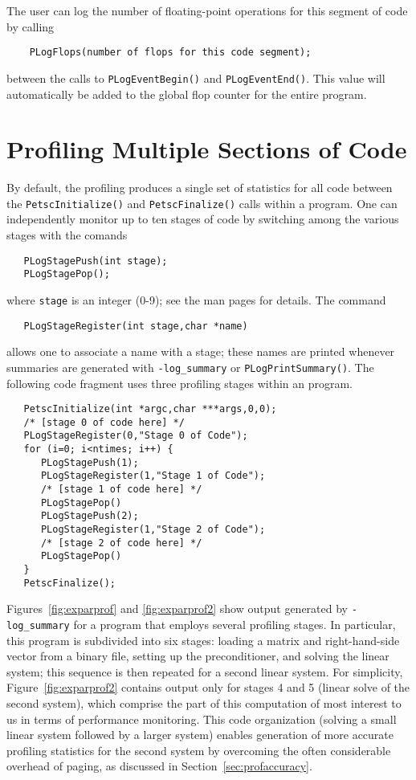 The user can log the number of floating-point operations 
for this segment of code by calling 
\begin{verbatim}
    PLogFlops(number of flops for this code segment);
\end{verbatim}
between the calls to {\tt PLogEventBegin()} and {\tt PLogEventEnd()}.
This value will automatically be added to the global flop counter for the
entire program.

\section{Profiling Multiple Sections of Code}
\label{sec:profstages}

By default, the profiling produces a single set of statistics for all
code between the {\tt PetscInitialize()} and {\tt PetscFinalize()}
calls within a program.  One can independently monitor up to ten
stages of code by switching among the various stages with the comands
 
\begin{verbatim}
   PLogStagePush(int stage);
   PLogStagePop();
\end{verbatim}
where {\tt stage} is an integer (0-9); see the man pages for details.
The command  
\begin{verbatim}
   PLogStageRegister(int stage,char *name)
\end{verbatim}
allows one to associate a name with a stage; these names are printed whenever
summaries are generated with {\tt -log\_summary} or {\tt PLogPrintSummary()}.
The following code fragment uses three profiling stages within an program.

\begin{verbatim}
   PetscInitialize(int *argc,char ***args,0,0);
   /* [stage 0 of code here] */
   PLogStageRegister(0,"Stage 0 of Code");
   for (i=0; i<ntimes; i++) {
      PLogStagePush(1);
      PLogStageRegister(1,"Stage 1 of Code");
      /* [stage 1 of code here] */
      PLogStagePop()
      PLogStagePush(2);
      PLogStageRegister(1,"Stage 2 of Code");
      /* [stage 2 of code here] */
      PLogStagePop()
   }
   PetscFinalize();
\end{verbatim}

Figures~\ref{fig:exparprof} and \ref{fig:exparprof2} show output
generated by {\tt -log\_summary} for a program that employs
several profiling stages.  In particular, this program is
subdivided into six stages: loading a matrix and right-hand-side
vector from a binary file, setting up the preconditioner, and solving
the linear system; this sequence is then repeated for a second linear
system.  For simplicity, Figure~\ref{fig:exparprof2} contains output
only for stages 4 and 5 (linear solve of the second system), which comprise
the part of this computation of most interest to us in terms of
performance monitoring.  This code organization (solving a small
linear system followed by a larger system) enables generation of more
accurate profiling statistics for the second system by overcoming the
often considerable overhead of paging, as discussed in
Section~\ref{sec:profaccuracy}.

